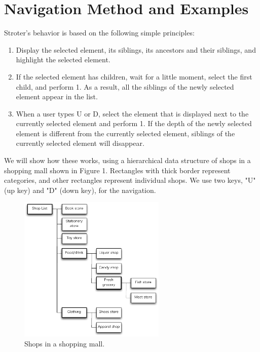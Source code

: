 \documentclass{article}
\begin{document}

\section*{Navigation Method and Examples}

Stroter's behavior is based on the following simple principles:

\begin{enumerate}
\item Display the selected element, its siblings, its ancestors and their siblings,
and highlight the selected element.
\item If the selected element has children, wait for a little moment,
select the first child, and perform 1.
As a result, all the siblings of the newly selected element appear in the list.
\item When a user types U or D, select the element that is displayed next to the currently
selected element and perform 1.
If the depth of the newly selected element is different from the currently
selected element, siblings of the currently selected element will disappear.
\end{enumerate}

We will show how these works, using a hierarchical data structure of
shops in a shopping mall shown in Figure 1.
Rectangles with thick border represent categories, and
other rectangles represent individual shops.
We use two keys, "U" (up key) and "D" (down key), for the navigation.

\begin{figure}[H]
\centerline{\includegraphics[width=70mm,bb=0 0 490 490]{figures/fig1.pdf}}
\caption{Shops in a shopping mall.}
\label{fig1}
\end{figure}
\end{document}
